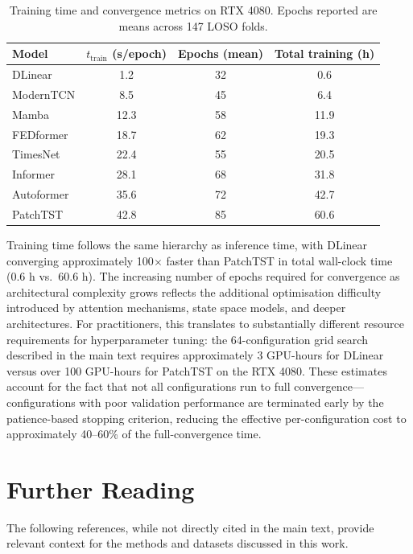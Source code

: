 \documentclass[runningheads]{llncs}
\begin{document}
\begin{table}[ht]
\centering
\caption{Training time and convergence metrics on RTX 4080. Epochs reported are means across 147 LOSO folds.}
\label{tab:s4_training}
\begin{tabular}{lccc}
\toprule
Model & $t_{\text{train}}$ (s/epoch) & Epochs (mean) & Total training (h) \\
\midrule
DLinear   & 1.2  & 32  & 0.6  \\
ModernTCN & 8.5  & 45  & 6.4  \\
Mamba     & 12.3 & 58  & 11.9 \\
FEDformer  & 18.7 & 62  & 19.3 \\
TimesNet  & 22.4 & 55  & 20.5 \\
Informer  & 28.1 & 68  & 31.8 \\
Autoformer & 35.6 & 72  & 42.7 \\
PatchTST   & 42.8 & 85  & 60.6 \\
\bottomrule
\end{tabular}
\end{table}

Training time follows the same hierarchy as inference time, with DLinear converging approximately 100$\times$ faster than PatchTST in total wall-clock time (0.6 h vs.\ 60.6 h). The increasing number of epochs required for convergence as architectural complexity grows reflects the additional optimisation difficulty introduced by attention mechanisms, state space models, and deeper architectures. For practitioners, this translates to substantially different resource requirements for hyperparameter tuning: the 64-configuration grid search described in the main text requires approximately 3 GPU-hours for DLinear versus over 100 GPU-hours for PatchTST on the RTX 4080. These estimates account for the fact that not all configurations run to full convergence—configurations with poor validation performance are terminated early by the patience-based stopping criterion, reducing the effective per-configuration cost to approximately 40--60\% of the full-convergence time.




\section*{Further Reading}

The following references, while not directly cited in the main text, provide relevant context for the methods and datasets discussed in this work.
\end{document}
